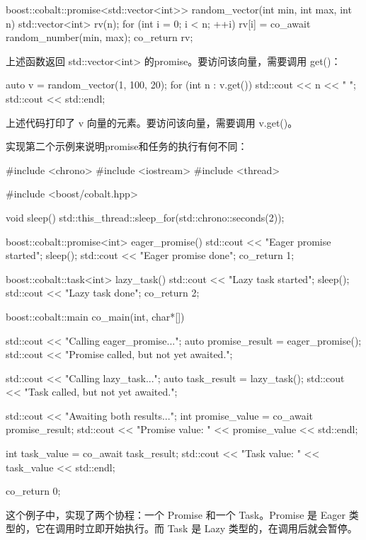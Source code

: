 \begin{cpp}
boost::cobalt::promise<std::vector<int>> random_vector(int min, int
max, int n) {
    std::vector<int> rv(n);
    for (int i = 0; i < n; ++i) {
        rv[i] = co_await random_number(min, max);
    }
    co_return rv;
}
\end{cpp}

上述函数返回 std::vector<int> 的promise。要访问该向量，需要调用 get()：

\begin{cpp}
auto v = random_vector(1, 100, 20);
for (int n : v.get()) {
    std::cout << n << " ";
}
std::cout << std::endl;
\end{cpp}

上述代码打印了 v 向量的元素。要访问该向量，需要调用 v.get()。

实现第二个示例来说明promise和任务的执行有何不同：

\begin{cpp}
#include <chrono>
#include <iostream>
#include <thread>

#include <boost/cobalt.hpp>

void sleep(){
    std::this_thread::sleep_for(std::chrono::seconds(2));
}

boost::cobalt::promise<int> eager_promise(){
    std::cout << "Eager promise started\n";
    sleep();
    std::cout << "Eager promise done\n";
    co_return 1;
}

boost::cobalt::task<int> lazy_task(){
    std::cout << "Lazy task started\n";
    sleep();
    std::cout << "Lazy task done\n";
    co_return 2;
}

boost::cobalt::main co_main(int, char*[]){
    std::cout << "Calling eager_promise...\n";
    auto promise_result = eager_promise();
    std::cout << "Promise called, but not yet awaited.\n";

    std::cout << "Calling lazy_task...\n";
    auto task_result = lazy_task();
    std::cout << "Task called, but not yet awaited.\n";

    std::cout << "Awaiting both results...\n";
    int promise_value = co_await promise_result;
    std::cout << "Promise value: " << promise_value
              << std::endl;

    int task_value = co_await task_result;
    std::cout << "Task value: " << task_value
              << std::endl;

    co_return 0;
}
\end{cpp}

这个例子中，实现了两个协程：一个 Promise 和一个 Task。Promise 是 Eager 类型的，它在调用时立即开始执行。而 Task 是 Lazy 类型的，在调用后就会暂停。

